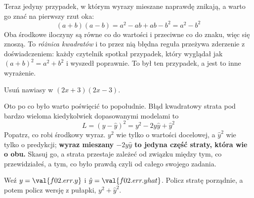 
\begin{fr}
Teraz jedyny przypadek, w którym wyrazy mieszane naprawdę znikają, a warto go
znać na pierwszy rzut oka:
\[ (a + b)(a - b) = a^{2} - ab + ab - b^{2} = a^{2} - b^{2} \]
Oba środkowe iloczyny są równe co do wartości i przeciwne co do znaku, więc się
znoszą. To \emph{różnica kwadratów} i to przez nią błędna reguła przeżywa
zderzenie z doświadczeniem: każdy czytelnik spotkał przypadek, który wyglądał
jak $(a+b)^{2} = a^{2} + b^{2}$ i wyszedł poprawnie. To był ten przypadek, a
jest to inne wyrażenie.

Usuń nawiasy w $(2x + 3)(2x - 3)$.
\nextframe
\end{fr}

\begin{fr}
Oto po co było warto poświęcić to popołudnie. Błąd kwadratowy \dash{} strata
pod bardzo wieloma kiedykolwiek dopasowanymi modelami \dash{} to
\[ L = (y - \hat{y})^{2} = y^{2} - 2y\hat{y} + \hat{y}^{2} \]
Popatrz, co robi środkowy wyraz. $y^{2}$ wie tylko o wartości docelowej, a
$\hat{y}^{2}$ wie tylko o predykcji; \textbf{wyraz mieszany $-2y\hat{y}$ to
jedyna część straty, która wie o obu.} Skasuj go, a strata przestaje zależeć od
związku między tym, co przewidziałeś, a tym, co było prawdą \dash{} czyli od
całego swojego zadania.

Weź $y = \val{f02.err.y}$ i $\hat{y} = \val{f02.err.yhat}$. Policz stratę
porządnie, a potem policz wersję z pułapki, $y^{2} + \hat{y}^{2}$.
\dotline
\nextframe
\end{fr}


